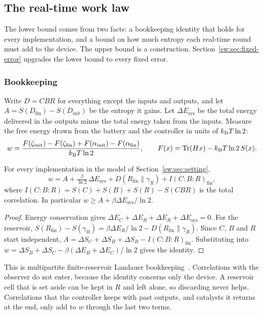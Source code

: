 \subsection{The real-time work law}\label{sw:sec:law}

The lower bound comes from two facts: a bookkeeping identity that holds for every implementation, and a bound on how much entropy each real-time round must add to the device. The upper bound is a construction. Section~\ref{sw:sec:fixed-error} upgrades the lower bound to every fixed error.

\subsubsection{Bookkeeping}

Write $D=CBR$ for everything except the inputs and outputs, and let $A=S(D_{\mathrm{fin}})-S(D_{\mathrm{init}})$ be the entropy it gains. Let $\Delta E_{\mathrm{sys}}$ be the total energy delivered in the outputs minus the total energy taken from the inputs. Measure the free energy drawn from the battery and the controller in units of $k_{\mathrm B} T\ln2$:
\[
w=\frac{F(\zeta_{\mathrm{init}})-F(\zeta_{\mathrm{fin}})+F(\alpha_{\mathrm{init}})-F(\alpha_{\mathrm{fin}})}{k_{\mathrm B} T\ln 2},\qquad F(x)=\operatorname{Tr}(H x)-k_{\mathrm B} T\ln2\,S(x).
\]

\begin{lemma}\label{sw:lem:accounting}
For every implementation in the model of Section~\ref{sw:sec:setting},
\[
w=A+\tfrac{\beta}{\ln2}\,\Delta E_{\mathrm{sys}}+D(R_{\mathrm{fin}}\|\gamma_R)+I(C{:}B{:}R)_{\mathrm{fin}},
\]
where $I(C{:}B{:}R)=S(C)+S(B)+S(R)-S(CBR)$ is the total correlation. In particular $w\ge A+\beta\Delta E_{\mathrm{sys}}/\ln2$.
\end{lemma}

\begin{proof}
Energy conservation gives $\Delta E_C+\Delta E_B+\Delta E_R+\Delta E_{\mathrm{sys}}=0$. For the reservoir, $S(R_{\mathrm{fin}})-S(\gamma_R)=\beta\Delta E_R/\ln2-D(R_{\mathrm{fin}}\|\gamma_R)$. Since $C$, $B$ and $R$ start independent, $A=\Delta S_C+\Delta S_B+\Delta S_R-I(C{:}B{:}R)_{\mathrm{fin}}$. Substituting into $w=\Delta S_B+\Delta S_C-\beta(\Delta E_B+\Delta E_C)/\ln2$ gives the identity.
\end{proof}

This is multipartite finite-reservoir Landauer bookkeeping~\cite{EspositoLindenbergVandenBroeck10,ReebWolf14}. Correlations with the observer do not enter, because the identity concerns only the device. A reservoir cell that is set aside can be kept in $R$ and left alone, so discarding never helps. Correlations that the controller keeps with past outputs, and catalysts it returns at the end, only add to $w$ through the last two terms.

